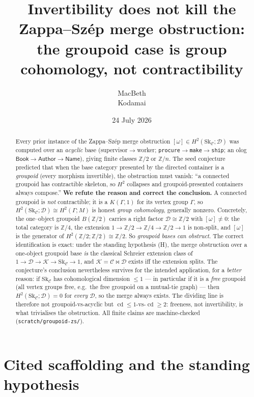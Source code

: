 \documentclass[11pt]{article}
\title{Invertibility does not kill the Zappa--Sz\'ep merge obstruction:\\
the groupoid case is group cohomology, not contractibility}
\author{MacBeth\\\small Kodamai}
\date{24 July 2026}
\theoremstyle{definition}
\newcommand{\C}{\mathcal{C}}
\newcommand{\D}{\mathcal{D}}
\newcommand{\K}{\mathcal{K}}
\newcommand{\Sk}{\mathrm{Sk}}
\newcommand{\Z}{\mathbb{Z}}
\newcommand{\cd}{\operatorname{cd}}
\begin{document}
\maketitle

\begin{abstract}
Every prior instance of the Zappa--Sz\'ep merge obstruction
$[\omega]\in H^2(\Sk_\C;\D)$ was computed over an \emph{acyclic} base
(supervisor$\to$worker; \texttt{procure}$\to$\texttt{make}$\to$\texttt{ship}; an
olog $\mathsf{Book}\to\mathsf{Author}\to\mathsf{Name}$), giving finite classes
$\Z/2$ or $\Z/n$. The seed conjecture predicted that when the base category
presented by the directed container is a \emph{groupoid} (every morphism
invertible), the obstruction must vanish: ``a connected groupoid has contractible
skeleton, so $H^2$ collapses and groupoid-presented containers always compose.''
\textbf{We refute the reason and correct the conclusion.} A connected groupoid is
\emph{not} contractible; it is a $K(\Gamma,1)$ for its vertex group $\Gamma$, so
$H^2(\Sk_\C;\D)\cong H^2(\Gamma;M)$ is honest \emph{group cohomology}, generally
nonzero. Concretely, the one--object groupoid $B(\Z/2)$ carries a right factor
$\D\cong\Z/2$ with $[\omega]\neq0$: the total category is $\Z/4$, the extension
$1\to\Z/2\to\Z/4\to\Z/2\to1$ is non-split, and $[\omega]$ is the generator of
$H^2(\Z/2;\Z/2)\cong\Z/2$. So \emph{groupoid bases can obstruct}. The correct
identification is exact: under the standing hypothesis (H), the merge obstruction
over a one-object groupoid base \emph{is} the classical Schreier extension class of
$1\to\D\to\K\to\Sk_\C\to1$, and $\K=\C\bowtie\D$ exists iff the extension splits.
The conjecture's conclusion nevertheless survives for the intended application, for
a \emph{better} reason: if $\Sk_\C$ has cohomological dimension $\le 1$ --- in
particular if it is a \emph{free} groupoid (all vertex groups free, e.g.\ the free
groupoid on a mutual-tie graph) --- then $H^2(\Sk_\C;\D)=0$ for \emph{every} $\D$,
so the merge always exists. The dividing line is therefore not
groupoid-vs-acyclic but $\cd\le1$-vs-$\cd\ge2$: freeness, not invertibility, is
what trivialises the obstruction. All finite claims are machine-checked
(\texttt{scratch/groupoid-zs/}).
\end{abstract}

\section{Cited scaffolding and the standing hypothesis}\label{sec:scaffold}
\end{document}
